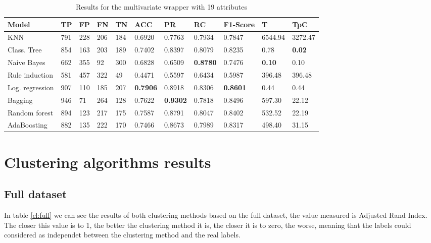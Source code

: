 \documentclass[a4paper,11pt]{article}
\begin{document}
\begin{table}
\centering
\begin{tabular}{|l|l|l|l|l|l|l|l|l|l|l|}
\hline

\textbf{Model} & \textbf{TP} & \textbf{FP} & \textbf{FN} & \textbf{TN} & \textbf{ACC} & \textbf{PR} & \textbf{RC} & \textbf{F1-Score} & \textbf{T} & \textbf{TpC} \\ \hline
KNN & 791 & 228 & 206 & 184 & 0.6920 & 0.7763 & 0.7934 & 0.7847 & 6544.94 & 3272.47 \\ \hline
Class. Tree & 854 & 163 & 203 & 189 & 0.7402 & 0.8397 & 0.8079 & 0.8235 & 0.78 & \textbf{0.02} \\ \hline
Naive Bayes & 662 & 355 & 92 & 300 & 0.6828 & 0.6509 & \textbf{0.8780} & 0.7476 & \textbf{0.10} & 0.10 \\ \hline
Rule induction & 581 & 457 & 322 & 49 & 0.4471 & 0.5597 & 0.6434 & 0.5987 & 396.48 & 396.48 \\ \hline
Log. regression & 907 & 110 & 185 & 207 & \textbf{0.7906} & 0.8918 & 0.8306 & \textbf{0.8601} & 0.44 & 0.44 \\ \hline
Bagging & 946 & 71 & 264 & 128 & 0.7622 & \textbf{0.9302} & 0.7818 & 0.8496 & 597.30 & 22.12 \\ \hline
Random forest & 894 & 123 & 217 & 175 & 0.7587 & 0.8791 & 0.8047 & 0.8402 & 532.52 & 22.19 \\ \hline
AdaBoosting & 882 & 135 & 222 & 170 & 0.7466 & 0.8673 & 0.7989 & 0.8317 & 498.40 & 31.15 \\ \hline

\end{tabular}
\caption{Results for the multivariate wrapper with 19 attributes}
\label{class:w75m}
\end{table}

\section{Clustering algorithms results}

\subsection{Full dataset}

In table \ref{cl:full} we can see the results of both clustering methods based on the full dataset, the value measured is Adjusted Rand Index. The closer this value is to 1, the better the clustering method it is, the closer it is to zero, the worse, meaning that the labels could considered as independet between the clustering method and the real labels.
\end{document}
